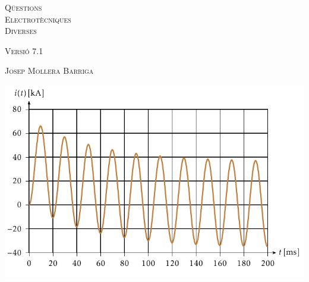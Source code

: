 \begin{titlepage}

   \parbox{18cm}{\fontsize{60pt}{60pt}\selectfont\color{NavyBlue}\scshape%
                 Q\"{u}estions\\[30pt] Electrot\`{e}cniques\\[30pt] Diverses}

   \vspace*{1.8cm}
   {\fontsize{30pt}{30pt}\selectfont\textsc{Versi\'{o} 7.1}}

   \vspace*{1.5cm}
   {\fontsize{40pt}{40pt}\selectfont\textsc{Josep Mollera Barriga}}

   \vspace*{1cm}
   \centering
   \includegraphics{Imatges/Cap-Fonaments-Exemple-R-L.pdf}

\end{titlepage}
